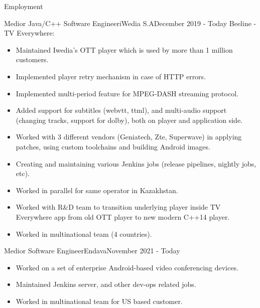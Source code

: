 \documentclass[]{mcdowellcv}
\begin{document}
\begin{cvsection}{Employment}
		\begin{cvsubsection}{Medior Java/C++ Software Engineer}{iWedia S.A}{December 2019 - Today}\vspace{\baselineskip}
			Beeline - TV Everywhere:
			\begin{itemize}
				\item Maintained Iwedia's OTT player which is used by more than 1 million customers.
				\item Implemented player retry mechanism in case of HTTP errors.
				\item Implemented multi-period feature for MPEG-DASH streaming protocol.
				\item Added support for subtitles (webvtt, ttml), and multi-audio support (changing tracks, support for dolby), both on player and application side.
				\item Worked with 3 different vendors (Geniatech, Zte, Superwave) in applying patches, using custom toolchains and building Android images.
				\item Creating and maintaining various Jenkins jobs (release pipelines, nightly jobs, etc).
				\item Worked in parallel for same operator in Kazakhstan.
				\item Worked with R\&D team to transition underlying player inside TV Everywhere app from old OTT player to new modern C++14 player. 
				\item Worked in multinational team (4 countries).
			\end{itemize}
		\end{cvsubsection}

		\begin{cvsubsection}{Medior Software Engineer}{Endava}{November 2021 - Today}\vspace{\baselineskip}
			\begin{itemize}
				\item Worked on a set of enterprise Android-based video conferencing devices.
				\item Maintained Jenkins server, and other dev-ops related jobs.
				\item Worked in multinational team for US based customer.
			\end{itemize}
		\end{cvsubsection}
	\end{cvsection}
\end{document}
